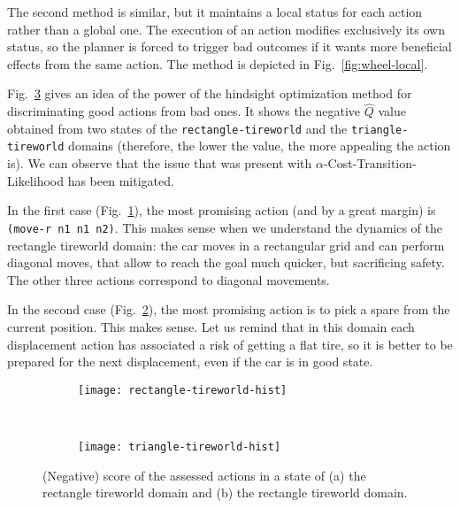 \documentclass[../root.tex]{subfiles}
\begin{document}
The second method is similar, but it maintains a local status for each action rather than
a global one. The execution of an action modifies exclusively its own status, so the
planner is forced to trigger bad outcomes if it wants more beneficial effects from
the same action. The method is depicted in Fig.~\ref{fig:wheel-local}.

Fig.~\ref{fig:hindsight-hists} gives an idea of the power of the hindsight optimization method
for discriminating good actions from bad ones. It shows the negative $ \hat{Q} $ value
obtained from two states of the \texttt{rectangle-tireworld} and the \texttt{triangle-tireworld}
domains (therefore, the lower the value, the more appealing the action is).
We can observe that the issue that was present with $ \alpha $-Cost-Transition-Likelihood has been
mitigated.

In the first case (Fig.~\ref{fig:hist-rectangle}), the most promising action (and by a great
margin) is \texttt{(move-r n1 n1 n2)}. This makes sense when we understand the dynamics of the
rectangle tireworld domain: the car moves in a rectangular grid and can perform diagonal moves,
that allow to reach the goal much quicker, but sacrificing safety. The other three actions correspond
to diagonal movements.

In the second case (Fig.~\ref{fig:hist-triangle}), the most promising action is to pick a spare
from the current position. This makes sense. Let us remind that in this domain each displacement
action has associated a risk of getting a flat tire, so it is better to be prepared for the next
displacement, even if the car is in good state.

\begin{figure}[tbhp]
	\centering
	\begin{subfigure}[b]{0.56\columnwidth}
		\texttt{[image: rectangle-tireworld-hist]}
		\caption{}
		\label{fig:hist-rectangle}
	\end{subfigure}
	~
	\begin{subfigure}[b]{0.30\columnwidth}
		\texttt{[image: triangle-tireworld-hist]}
		\caption{}
		\label{fig:hist-triangle}
	\end{subfigure}
	\caption{
		(Negative) score of the assessed actions in a state of
		(a) the rectangle tireworld domain and
		(b) the rectangle tireworld domain.
	}
	\label{fig:hindsight-hists}
\end{figure}

\end{document}
